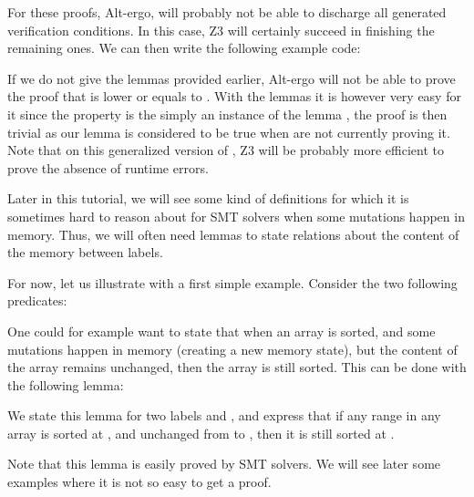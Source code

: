 


For these proofs, Alt-ergo, will probably not be able to discharge all
generated verification conditions. In this case, Z3 will certainly succeed
in finishing the remaining ones. We can then write the following example code:






If we do not give the lemmas provided earlier, Alt-ergo will not be able
to prove the proof that  is lower or equals to
. With the lemmas it is however very easy for it since the
property is the simply an instance of the lemma
, the proof is then trivial as our lemma is
considered to be true when are not currently proving it. Note that on this
generalized version of , Z3 will be probably more efficient
to prove the absence of runtime errors.




Later in this tutorial, we will see some kind of definitions for which it is
sometimes hard to reason about for SMT solvers when some mutations happen in
memory. Thus, we will often need lemmas to state relations about the content
of the memory between labels.


For now, let us illustrate with a first simple example. Consider the two following
predicates:




One could for example want to state that when an array is sorted, and some
mutations happen in memory (creating a new memory state), but the content of the
array remains unchanged, then the array is still sorted. This can be done with
the following lemma:




We state this lemma for two labels  and , and
express that if any range in any array is sorted at , and
unchanged from  to , then it is still sorted at
.


Note that this lemma is easily proved by SMT solvers. We will see later some
examples where it is not so easy to get a proof.




